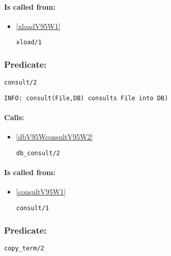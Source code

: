 \paragraph{Is called from:} 
\begin{itemize}
\item \ref{xloadV95W1} 
\begin{verbatim}
xload/1
\end{verbatim}

\end{itemize}

\subsubsection{Predicate:} \label{consultV95W2}

\begin{verbatim}
consult/2
\end{verbatim}

{\small \begin{verbatim}
INFO: consult(File,DB) consults File into DB)

\end{verbatim}}
\paragraph{Calls:} 
\begin{itemize}
\item \ref{dbV95WconsultV95W2} 
\begin{verbatim}
db_consult/2
\end{verbatim}

\end{itemize}
\paragraph{Is called from:} 
\begin{itemize}
\item \ref{consultV95W1} 
\begin{verbatim}
consult/1
\end{verbatim}

\end{itemize}

\subsubsection{Predicate:} \label{copyV95WtermV95W2}

\begin{verbatim}
copy_term/2
\end{verbatim}

